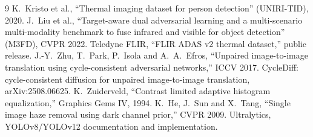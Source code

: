 \documentclass[11pt,a4paper]{article}
\begin{document}
\begin{thebibliography}{9}
 K.~Kristo et al., ``Thermal imaging dataset for person detection''
(UNIRI-TID), 2020.
 J.~Liu et al., ``Target-aware dual adversarial learning and a
multi-scenario multi-modality benchmark to fuse infrared and visible for object
detection'' (M3FD), CVPR 2022.
 Teledyne FLIR, ``FLIR ADAS v2 thermal dataset,'' public release.
 J.-Y.~Zhu, T.~Park, P.~Isola and A.~A.~Efros, ``Unpaired
image-to-image translation using cycle-consistent adversarial networks,''
ICCV 2017.
 CycleDiff: cycle-consistent diffusion for unpaired
image-to-image translation, arXiv:2508.06625.
 K.~Zuiderveld, ``Contrast limited adaptive histogram
equalization,'' Graphics Gems IV, 1994.
 K.~He, J.~Sun and X.~Tang, ``Single image haze removal using
dark channel prior,'' CVPR 2009.
 Ultralytics, YOLOv8/YOLOv12 documentation and implementation.
\end{thebibliography}
\end{document}

